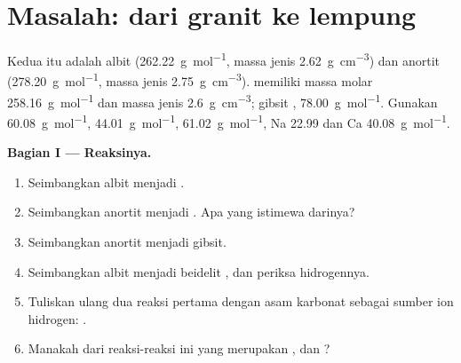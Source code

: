 \section{Masalah: dari granit ke lempung}

\begin{problem}
\label{pb:b1:weathering-clays:1}
Kedua  itu adalah albit  (\qty{262.22}{g.mol^{-1}}, massa jenis
\qty{2.62}{g.cm^{-3}}) dan anortit 
(\qty{278.20}{g.mol^{-1}}, massa jenis \qty{2.75}{g.cm^{-3}}). 
 memiliki massa molar \qty{258.16}{g.mol^{-1}} dan massa jenis
\qty{2.6}{g.cm^{-3}}; gibsit , \qty{78.00}{g.mol^{-1}}. Gunakan
 \qty{60.08}{g.mol^{-1}},  \qty{44.01}{g.mol^{-1}}, 
\qty{61.02}{g.mol^{-1}}, Na \num{22.99} dan Ca \qty{40.08}{g.mol^{-1}}.

\medskip
\noindent\textbf{Bagian I --- Reaksinya.}
\begin{enumerate}
  \item Seimbangkan  albit menjadi .
  \item Seimbangkan  anortit menjadi . Apa yang istimewa darinya?
  \item Seimbangkan  anortit menjadi gibsit.
  \item Seimbangkan  albit menjadi beidelit
        , dan periksa hidrogennya.
  \item Tuliskan ulang dua reaksi pertama dengan asam karbonat sebagai sumber
        ion hidrogen: .
  \item Manakah dari reaksi-reaksi ini yang merupakan ,  dan ?
\end{enumerate}


\end{problem}

